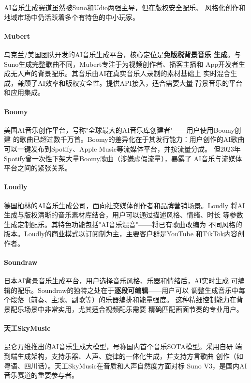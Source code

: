 AI音乐生成赛道虽然被Suno和Udio两强主导，但在版权安全配乐、
风格化创作和地域市场中仍活跃着多个有特色的中小玩家。

\paragraph{Mubert}
乌克兰/美国团队开发的AI音乐生成平台，核心定位是\textbf{免版税背景音乐
生成}。与Suno生成完整歌曲不同，Mubert专注于为视频创作者、播客主播和
App开发者生成无人声的背景配乐。其音乐由AI在真实音乐人录制的素材基础上
实时混合生成，兼顾了AI效率和版权安全性。提供API接入，适合需要大量
背景音乐的平台和应用集成。

\paragraph{Boomy}
美国AI音乐创作平台，号称"全球最大的AI音乐库创建者"——用户使用Boomy创建
的歌曲已超过数千万首。Boomy的差异化在于其发行能力：用户创作的AI歌曲
可以一键发布到Spotify、Apple Music等流媒体平台，并按流量分成。
但2023年Spotify曾一次性下架大量Boomy歌曲（涉嫌虚假流量），暴露了
AI音乐与流媒体平台之间的紧张关系。

\paragraph{Loudly}
德国柏林的AI音乐生成公司，面向社交媒体创作者和品牌营销场景。Loudly
将AI生成与版权清晰的音乐素材库结合，用户可以通过描述风格、情绪、时长
等参数生成定制配乐。其特色功能包括"AI音乐混音"——将已有歌曲改编为
不同风格的版本。Loudly的商业模式以订阅制为主，主要客户群是YouTube
和TikTok内容创作者。

\paragraph{Soundraw}
日本AI背景音乐生成平台，用户选择音乐风格、乐器和情绪后，AI实时生成
可编辑的配乐。Soundraw的独特之处在于\textbf{逐段可编辑}——用户可以
调整生成音乐中每个段落（前奏、主歌、副歌等）的乐器编排和能量强度。
这种精细控制能力在背景配乐场景中非常实用，尤其适合视频配乐需要
精确匹配画面节奏的专业用户。

\paragraph{天工SkyMusic}
昆仑万维推出的AI音乐生成大模型，号称国内首个音乐SOTA模型。采用自研
端到端生成架构，支持乐器、人声、旋律的一体化生成，并支持方言歌曲
创作（如粤语、四川话）。天工SkyMusic在音质和人声自然度方面对标
Suno V3，是国内AI音乐赛道的重要参与者。

